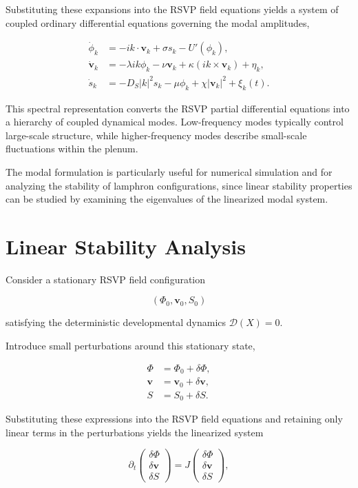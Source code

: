 \documentclass[12pt]{article}
\begin{document}
Substituting these expansions into the RSVP field equations yields a system of coupled ordinary differential equations governing the modal amplitudes,

\begin{align}
\dot{\phi}_k &= - i k \cdot \mathbf{v}_k + \sigma s_k - U'(\phi_k), \\
\dot{\mathbf{v}}_k &= -\lambda i k \phi_k - \nu \mathbf{v}_k + \kappa (i k \times \mathbf{v}_k) + \eta_k, \\
\dot{s}_k &= -D_S |k|^2 s_k - \mu \phi_k + \chi |\mathbf{v}_k|^2 + \xi_k(t).
\end{align}

This spectral representation converts the RSVP partial differential equations into a hierarchy of coupled dynamical modes. Low-frequency modes typically control large-scale structure, while higher-frequency modes describe small-scale fluctuations within the plenum.

The modal formulation is particularly useful for numerical simulation and for analyzing the stability of lamphron configurations, since linear stability properties can be studied by examining the eigenvalues of the linearized modal system.

\section{Linear Stability Analysis}
\label{sec:linear_stability}

Consider a stationary RSVP field configuration

\begin{equation}
(\Phi_0,\mathbf{v}_0,S_0)
\end{equation}

satisfying the deterministic developmental dynamics $\mathcal{D}(X)=0$.

Introduce small perturbations around this stationary state,

\begin{align}
\Phi &= \Phi_0 + \delta \Phi, \\
\mathbf{v} &= \mathbf{v}_0 + \delta \mathbf{v}, \\
S &= S_0 + \delta S .
\end{align}

Substituting these expressions into the RSVP field equations and retaining only linear terms in the perturbations yields the linearized system

\begin{equation}
\partial_t
\begin{pmatrix}
\delta \Phi \\
\delta \mathbf{v} \\
\delta S
\end{pmatrix}
=
J
\begin{pmatrix}
\delta \Phi \\
\delta \mathbf{v} \\
\delta S
\end{pmatrix},
\label{eq:linearized_system}
\end{equation}
\end{document}
